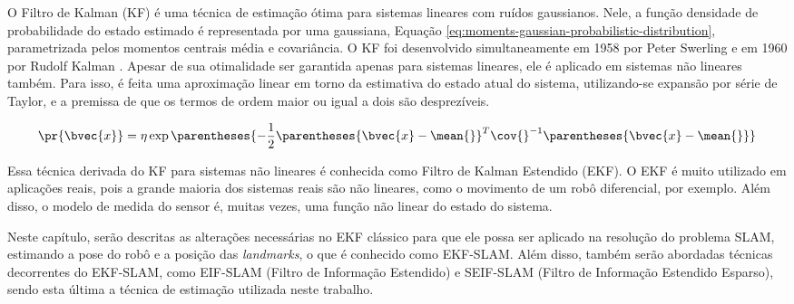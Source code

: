 O Filtro de Kalman (KF) é uma técnica de estimação ótima para sistemas lineares com ruídos gaussianos. Nele, a função densidade de probabilidade do estado estimado é representada por uma gaussiana, 
Equação \ref{eq:moments-gaussian-probabilistic-distribution}, parametrizada pelos momentos centrais média e covariância. O KF foi desenvolvido simultaneamente em 1958 por Peter Swerling e em 1960 por Rudolf Kalman \cite[p.~40]{thrun2005probabilistic}. Apesar de sua otimalidade ser garantida apenas para sistemas lineares, ele é aplicado em sistemas não lineares também. Para isso, é feita uma aproximação linear em torno da estimativa do estado atual do sistema, utilizando-se expansão por série de Taylor, e a premissa de que os termos de ordem maior ou igual a dois são desprezíveis.

\begin{equation}
  \pr{\bvec{x}} = \eta \exp\parentheses{-\frac{1}{2} 
  \parentheses{\bvec{x} - \mean{}}^T \cov{}^{-1}\parentheses{\bvec{x} - \mean{}}}
  \label{eq:moments-gaussian-probabilistic-distribution}
\end{equation}

Essa técnica derivada do KF para sistemas não lineares é conhecida como Filtro de Kalman Estendido (EKF). O EKF é muito utilizado em aplicações reais, pois a grande maioria dos sistemas reais são não lineares, como o movimento de um robô diferencial, por exemplo. Além disso, o modelo de medida do sensor é, muitas vezes, uma função não linear do estado do sistema.

Neste capítulo, serão descritas as alterações necessárias no EKF clássico para que ele possa ser aplicado na resolução do problema SLAM, estimando a pose do robô e a posição das \textit{landmarks}, o que é conhecido como EKF-SLAM. Além disso, também serão abordadas técnicas decorrentes do EKF-SLAM, como EIF-SLAM (Filtro de Informação Estendido) e SEIF-SLAM (Filtro de Informação Estendido Esparso), sendo esta última a técnica de estimação utilizada neste trabalho.

